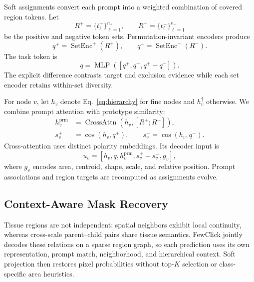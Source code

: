 \documentclass[letterpaper]{article}
\begin{document}
Soft assignments convert each prompt into a weighted combination of covered region tokens. Let
\begin{equation}
R^{+}=\{t_{\ell}^{+}\}_{\ell=1}^{n_+},\qquad
R^{-}=\{t_{\ell}^{-}\}_{\ell=1}^{n_-}
\label{eq:prompt-sets}
\end{equation}
be the positive and negative token sets. Permutation-invariant encoders \cite{zaheer2017deepsets,lee2019settransformer} produce
\begin{equation}
q^+=\operatorname{SetEnc}^{+}(R^+),\qquad
q^-=\operatorname{SetEnc}^{-}(R^-).
\label{eq:prompt-encode}
\end{equation}
The task token is
\begin{equation}
q=\operatorname{MLP}\left([q^+,q^-,q^+-q^-]\right).
\label{eq:task-token}
\end{equation}
The explicit difference contrasts target and exclusion evidence while each set encoder retains within-set diversity.

For node $v$, let $h_v$ denote Eq.~\eqref{eq:hierarchy} for fine nodes and $h_v^{\uparrow}$ otherwise. We combine prompt attention with prototype similarity:
\begin{equation}
\begin{split}
h_v^{\mathrm{prm}}
&=\operatorname{CrossAttn}\!\left(h_v,[R^+;R^-]\right),\\
s_v^+&=\cos(h_v,q^+),\qquad s_v^-=\cos(h_v,q^-).
\end{split}
\label{eq:prompt-match}
\end{equation}
Cross-attention uses distinct polarity embeddings. Its decoder input is
\begin{equation}
u_v=[h_v,q,h_v^{\mathrm{prm}},s_v^+-s_v^-,g_v],
\label{eq:node-feature}
\end{equation}
where $g_v$ encodes area, centroid, shape, scale, and relative position. Prompt associations and region targets are recomputed as assignments evolve.

\subsection{Context-Aware Mask Recovery}
Tissue regions are not independent: spatial neighbors exhibit local continuity, whereas cross-scale parent--child pairs share tissue semantics. FewClick jointly decodes these relations on a sparse region graph, so each prediction uses its own representation, prompt match, neighborhood, and hierarchical context. Soft projection then restores pixel probabilities without top-$K$ selection or class-specific area heuristics.
\end{document}
